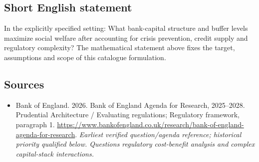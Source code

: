 \documentclass[11pt]{article}
\begin{document}
\subsection{Short English statement}
In the explicitly specified setting: What bank-capital structure and buffer levels maximize social welfare after accounting for crisis prevention, credit supply and regulatory complexity? The mathematical statement above fixes the target, assumptions and scope of this catalogue formulation.

\subsection{Sources}
\begin{itemize}\raggedright
\item[\textnormal{[S1]}]\hypertarget{source:30007602:1}{} Bank of England. 2026. Bank of England Agenda for Research, 2025–2028. Prudential Architecture / Evaluating regulations; Regulatory framework, paragraph 1.
\url{https://www.bankofengland.co.uk/research/bank-of-england-agenda-for-research}.
{\small\textit{Earliest verified question/agenda reference; historical priority qualified below. Questions regulatory cost-benefit analysis and complex capital-stack interactions.}}
\end{itemize}
\end{document}
